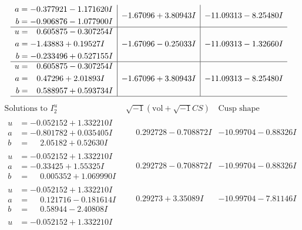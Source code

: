 \documentclass[1p]{elsarticle_modified}
\theoremstyle{definition}
\newcommand{\I}{\sqrt{-1}}
\begin{document}
$$\begin{array}{c|c|c}
\begin{aligned}
a &= -0.377921 - 1.171620 I \\
b &= -0.906876 - 1.077900 I\end{aligned}
 & -1.67096 + 3.80943 I & -11.09313 - 8.25480 I \\ \hline\begin{aligned}
u &= \phantom{-}0.605875 - 0.307254 I \\
a &= -1.43883 + 0.19527 I \\
b &= -0.233496 + 0.527155 I\end{aligned}
 & -1.67096 - 0.25033 I & -11.09313 - 1.32660 I \\ \hline\begin{aligned}
u &= \phantom{-}0.605875 - 0.307254 I \\
a &= \phantom{-}0.47296 + 2.01893 I \\
b &= \phantom{-}0.588957 + 0.593734 I\end{aligned}
 & -1.67096 + 3.80943 I & -11.09313 - 8.25480 I\\
 \hline 
 \end{array}$$\newpage$$\begin{array}{c|c|c}  
\text{Solutions to }I^u_{2}& \I (\text{vol} + \sqrt{-1}CS) & \text{Cusp shape}\\
 \hline 
\begin{aligned}
u &= -0.052152 + 1.332210 I \\
a &= -0.801782 + 0.035405 I \\
b &= \phantom{-}2.05182 + 0.52630 I\end{aligned}
 & \phantom{-}0.292728 - 0.708872 I & -10.99704 - 0.88326 I \\ \hline\begin{aligned}
u &= -0.052152 + 1.332210 I \\
a &= -0.33425 + 1.55325 I \\
b &= \phantom{-}0.005352 + 1.069990 I\end{aligned}
 & \phantom{-}0.292728 - 0.708872 I & -10.99704 - 0.88326 I \\ \hline\begin{aligned}
u &= -0.052152 + 1.332210 I \\
a &= \phantom{-}0.121716 - 0.181614 I \\
b &= \phantom{-}0.58944 - 2.40808 I\end{aligned}
 & \phantom{-}0.29273 + 3.35089 I & -10.99704 - 7.81146 I \\ \hline\begin{aligned}
u &= -0.052152 + 1.332210 I \\

\end{aligned}
\end{array}$$
\end{document}
